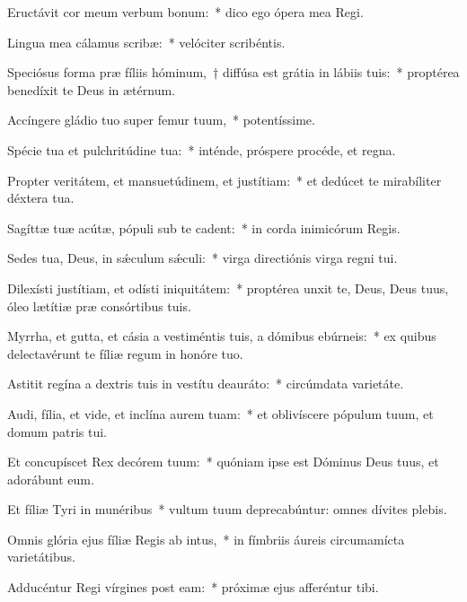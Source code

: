 \item Eructávit cor meum verbum bonum:~* dico ego ópera mea Regi.

\item Lingua mea cálamus scribæ:~* velóciter scribéntis.

\item Speciósus forma præ fíliis hóminum,~† diffúsa est grátia in lábiis tuis:~* proptérea benedíxit te Deus in ætérnum.

\item Accíngere gládio tuo super femur tuum,~* potentíssime.

\item Spécie tua et pulchritúdine tua:~* inténde, próspere procéde, et regna.

\item Propter veritátem, et mansuetúdinem, et justítiam:~* et dedúcet te mirabíliter déxtera tua.

\item Sagíttæ tuæ acútæ, pópuli sub te cadent:~* in corda inimicórum Regis.

\item Sedes tua, Deus, in sǽculum sǽculi:~* virga directiónis virga regni tui.

\item Dilexísti justítiam, et odísti iniquitátem:~* proptérea unxit te, Deus, Deus tuus, óleo lætítiæ præ consórtibus tuis.

\item Myrrha, et gutta, et cásia a vestiméntis tuis, a dómibus ebúrneis:~* ex quibus delectavérunt te fíliæ regum in honóre tuo.

\item Astitit regína a dextris tuis in vestítu deauráto:~* circúmdata varietáte.

\item Audi, fília, et vide, et inclína aurem tuam:~* et oblivíscere pópulum tuum, et domum patris tui.

\item Et concupíscet Rex decórem tuum:~* quóniam ipse est Dóminus Deus tuus, et adorábunt eum.

\item Et fíliæ Tyri in munéribus~* vultum tuum deprecabúntur: omnes dívites plebis.

\item Omnis glória ejus fíliæ Regis ab intus,~* in fímbriis áureis circumamícta varietátibus.

\item Adducéntur Regi vírgines post eam:~* próximæ ejus afferéntur tibi.

